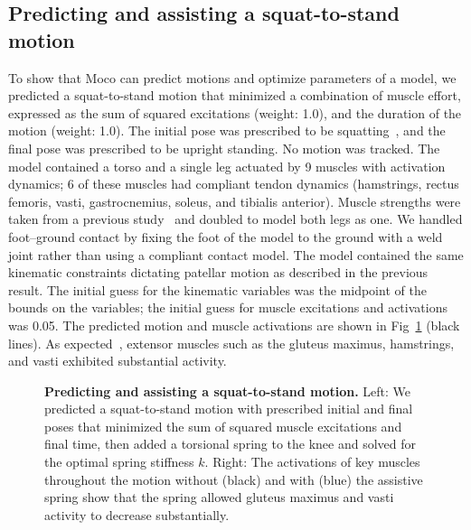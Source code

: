\documentclass[10pt,letterpaper]{article}
\begin{document}
\subsection*{Predicting and assisting a squat-to-stand motion}

To show that Moco can predict motions and optimize parameters of a model, we predicted a squat-to-stand motion that minimized a combination of muscle effort, expressed as the sum of squared excitations (weight: 1.0), and the duration of the motion (weight: 1.0). The initial pose was prescribed to be squatting~\cite{Fregly:2015}, and the final pose was prescribed to be upright standing. No motion was tracked. The model contained a torso and a single leg actuated by 9 muscles with activation dynamics; 6 of these muscles had compliant tendon dynamics (hamstrings, rectus femoris, vasti, gastrocnemius, soleus, and tibialis anterior). Muscle strengths were taken from a previous study~\cite{Ong:2019} and doubled to model both legs as one. We handled foot--ground contact by fixing the foot of the model to the ground with a weld joint rather than using a compliant contact model. The model contained the same kinematic constraints dictating patellar motion as described in the previous result. The initial guess for the kinematic variables was the midpoint of the bounds on the variables; the initial guess for muscle excitations and activations was 0.05. The predicted motion and muscle activations are shown in Fig~\ref{squattostand} (black lines). As expected~\cite{Yavuz:2017}, extensor muscles such as the gluteus maximus, hamstrings, and vasti exhibited substantial activity.

\begin{figure}[!h]
        \centering
        \caption{{\bf Predicting and assisting a squat-to-stand motion.}
            Left: We predicted a squat-to-stand motion with prescribed initial and final poses that minimized the sum of squared muscle excitations and final time, then added a torsional spring to the knee and solved for the optimal spring stiffness $k$. Right: The activations of key muscles throughout the motion without (black) and with (blue) the assistive spring show that the spring allowed gluteus maximus and vasti activity to decrease substantially.
        }
        \label{squattostand}
\end{figure}
\end{document}

